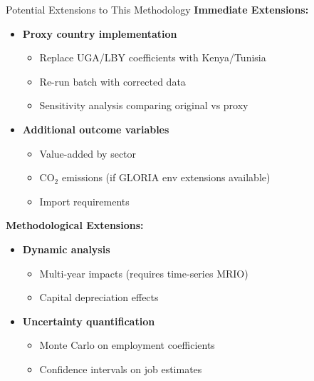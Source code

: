 \documentclass[10pt]{beamer}
\begin{document}

\begin{frame}{Potential Extensions to This Methodology}
\textbf{Immediate Extensions:}

\vspace{0.3cm}

\begin{itemize}
    \item \textbf{Proxy country implementation}
    \begin{itemize}
        \item Replace UGA/LBY coefficients with Kenya/Tunisia
        \item Re-run batch with corrected data
        \item Sensitivity analysis comparing original vs proxy
    \end{itemize}

    \vspace{0.2cm}

    \item \textbf{Additional outcome variables}
    \begin{itemize}
        \item Value-added by sector
        \item CO$_2$ emissions (if GLORIA env extensions available)
        \item Import requirements
    \end{itemize}
\end{itemize}

\vspace{0.5cm}

\textbf{Methodological Extensions:}

\vspace{0.3cm}

\begin{itemize}
    \item \textbf{Dynamic analysis}
    \begin{itemize}
        \item Multi-year impacts (requires time-series MRIO)
        \item Capital depreciation effects
    \end{itemize}

    \item \textbf{Uncertainty quantification}
    \begin{itemize}
        \item Monte Carlo on employment coefficients
        \item Confidence intervals on job estimates
    \end{itemize}
\end{itemize}

\end{frame}
\end{document}
